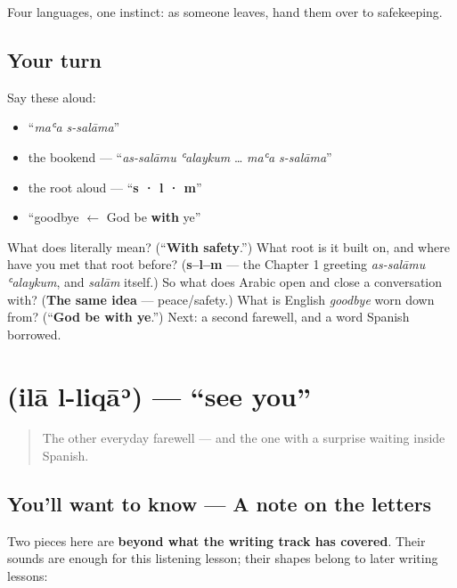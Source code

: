 Four languages, one instinct: as someone leaves, hand them over to safekeeping.

\subsection*{Your turn}
Say these aloud:

\begin{itemize}
\raggedright
  \item \textquotedblleft{}\emph{maʿa s-salāma}\textquotedblright{}
  \item the bookend — \textquotedblleft{}\emph{as-salāmu ʿalaykum} … \emph{maʿa s-salāma}\textquotedblright{}
  \item the root aloud — \textquotedblleft{}\textbf{s · l · m}\textquotedblright{}
  \item \textquotedblleft{}goodbye $\leftarrow$ God be \textbf{with} ye\textquotedblright{}
\end{itemize}

\begin{tcolorbox}[breakable,colback=teal!4,colframe=teal!35!black,title={Before you move on}]
What does \textbf{ } literally mean? (\textquotedblleft{}\textbf{With safety}.\textquotedblright{}) What root is it built on, and where have you met that root before? (\textbf{s–l–m} — the Chapter 1 greeting \emph{as-salāmu ʿalaykum}, and \emph{salām} itself.) So what does Arabic open and close a conversation with? (\textbf{The same idea} — peace/safety.) What is English \emph{goodbye} worn down from? (\textquotedblleft{}\textbf{God be with ye}.\textquotedblright{}) Next: a second farewell, and a word Spanish borrowed.
\end{tcolorbox}
\section[\texorpdfstring{\ar{إلى} \ar{اللقاء} (ilā l-liqāʾ)}{إلى اللقاء (ilā l-liqāʾ)}]{  (ilā l-liqāʾ) — \textquotedblleft{}see you\textquotedblright{}}

\label{lesson:AR-C04-ila-liqaa}



\begin{quote}
The other everyday farewell — and the one with a surprise waiting inside Spanish.
\end{quote}

\subsection*{You'll want to know — A note on the letters}
Two pieces here are \textbf{beyond what the writing track has covered}. Their sounds are enough for this listening lesson; their shapes belong to later writing lessons:

